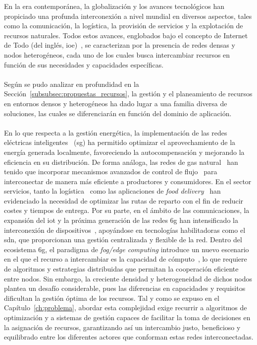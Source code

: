 En la era contemporánea, la globalización y los avances tecnológicos han propiciado una profunda interconexión a nivel mundial en diversos aspectos, tales como la comunicación, la logística, la provisión de servicios y la explotación de recursos naturales. Todos estos avances, englobados bajo el concepto de Internet de Todo (del inglés, \gls{ioe})~\cite{Akan23}, se caracterizan por la presencia de redes densas y nodos heterogéneos, cada uno de los cuales busca intercambiar recursos en función de sus necesidades y capacidades específicas.\\
\\
Según se pudo analizar en profundidad en la Sección~\ref{subsubsec:propuestas_recursos}, la gestión y el planeamiento de recursos en entornos densos y heterogéneos ha dado lugar a una familia diversa de soluciones, las cuales se diferenciarán en función del dominio de aplicación.\\
\\
En lo que respecta a la gestión energética, la implementación de las redes eléctricas inteligentes~\cite{Rodriguez16,Tenti23} (\gls{sg}) ha permitido optimizar el aprovechamiento de la energía generada localmente, favoreciendo la autocompensación y mejorando la eficiencia en su distribución. De forma análoga, las redes de gas natural~\cite{Midthun13} han tenido que incorporar mecanismos avanzados de control de flujo~\cite{Zlotnik15} para interconectar de manera más eficiente a productores y consumidores. En el sector servicios, tanto la logística~\cite{moreno2024multi,Chen21taxi} como las aplicaciones de \textit{food delivery}~\cite{Nguyen23,Liu19food} han evidenciado la necesidad de optimizar las rutas de reparto con el fin de reducir costes y tiempos de entrega. Por su parte, en el ámbito de las comunicaciones, la expansión del \gls{iot} y la próxima generación de las redes \gls{6g} han intensificado la interconexión de dispositivos~\cite{jiang2021road}, apoyándose en tecnologías habilitadoras como el \gls{sdn}, que proporcionan una gestión centralizada y flexible de la red. Dentro del ecosistema \gls{6g}, el paradigma de \textit{fog/edge computing} introduce un nuevo escenario en el que el recurso a intercambiar es la capacidad de cómputo~\cite{Bachiega23}, lo que requiere de algoritmos y estrategias distribuidas que permitan la cooperación eficiente entre nodos. Sin embargo, la creciente densidad y heterogeneidad de dichos nodos plantea un desafío considerable, pues las diferencias en capacidades y requisitos dificultan la gestión óptima de los recursos. Tal y como se expuso en el Capítulo~\ref{ch:problema}, abordar esta complejidad exige recurrir a algoritmos de optimización y a sistemas de gestión capaces de facilitar la toma de decisiones en la asignación de recursos, garantizando así un intercambio justo, beneficioso y equilibrado entre los diferentes actores que conforman estas redes interconectadas.\\
